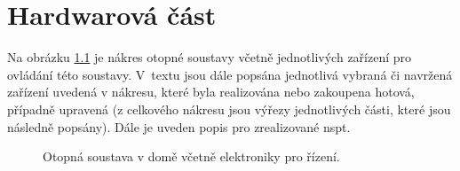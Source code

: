 \chapter{Hardwarová část}

Na obrázku \ref{fig:otopna-soustava-a-elektronika-rez-domu} je nákres otopné soustavy včetně jednotlivých zařízení pro ovládání této soustavy. V~textu jsou dále popsána jednotlivá vybraná či navržená zařízení uvedená v nákresu, které byla realizována nebo zakoupena hotová, případně upravená (z celkového nákresu jsou výřezy jednotlivých části, které jsou následně popsány). Dále je uveden popis pro zrealizované \acrshort{nspt}.

\newpage

\begin{figure}[H]
    \centering
    \def\svgwidth{\columnwidth}
    
    \caption{Otopná soustava v domě včetně elektroniky pro řízení.}
    \label{fig:otopna-soustava-a-elektronika-rez-domu}
\end{figure}


























